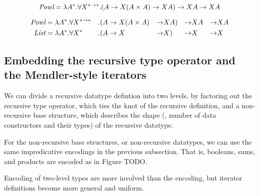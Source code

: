 \[
\textit{Powl} = \lambda A^{*}.\forall X^{* -> *} .
	(A -> X(A\times A) -> XA) -> XA  -> XA \\
\]

\begin{align*}
\textit{Powl} &= \lambda A^{*}.\forall X^{* -> *}&.&
	(A -> X(A\times A) & -> & XA) & -> & XA & -> & XA \\
\textit{List} &= \lambda A^{*}.\forall X^{*}&.&
	(A -> X & -> & X) & -> & X & -> & X
\end{align*}


\subsection{
   Embedding the recursive type operator and the Mendler-style iterators}
\label{ssec:embedTwoLevel}
We can divide a recursive datatype defintion into two levels,
by factoring out the recursive type operator, which ties the knot of
the recursive definition, and a non-recursive base structure,
which describes the shape (\ie, number of data constructors and their types) of
the recursive datatype.

For the non-recursive base structures, or non-recursive datatypes,
we can use the same impredicative encodings in the previous subsection.
That is, booleans, sums, and products are encoded as in Figure TODO.

Encoding of two-level types are more involved than the encoding, but
iterator definitions become more general and uniform.

